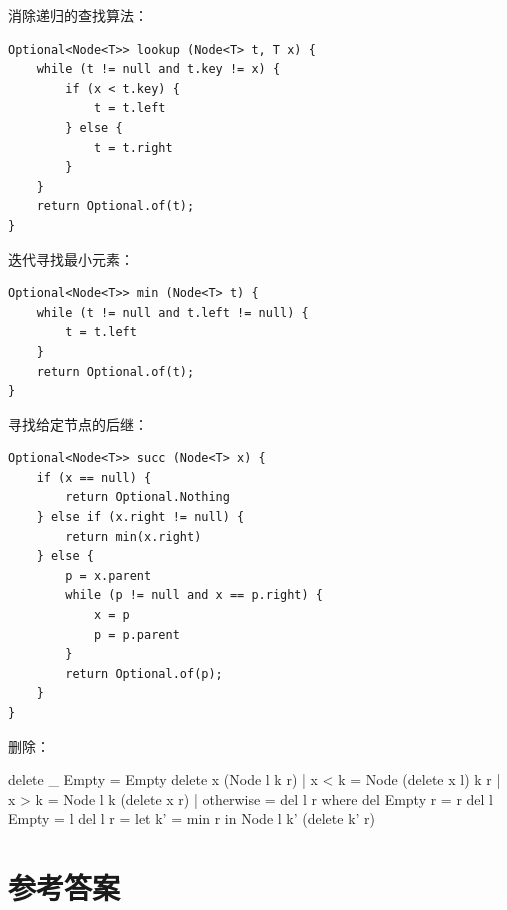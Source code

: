 \documentclass[b5paper]{ctexart}
\begin{document}
消除递归的查找算法：

\begin{lstlisting}
Optional<Node<T>> lookup (Node<T> t, T x) {
    while (t != null and t.key != x) {
        if (x < t.key) {
            t = t.left
        } else {
            t = t.right
        }
    }
    return Optional.of(t);
}
\end{lstlisting}

迭代寻找最小元素：

\begin{lstlisting}
Optional<Node<T>> min (Node<T> t) {
    while (t != null and t.left != null) {
        t = t.left
    }
    return Optional.of(t);
}
\end{lstlisting}

寻找给定节点的后继：

\begin{lstlisting}
Optional<Node<T>> succ (Node<T> x) {
    if (x == null) {
        return Optional.Nothing
    } else if (x.right != null) {
        return min(x.right)
    } else {
        p = x.parent
        while (p != null and x == p.right) {
            x = p
            p = p.parent
        }
        return Optional.of(p);
    }
}
\end{lstlisting}

删除：

\begin{Haskell}
delete _ Empty = Empty
delete x (Node l k r) | x < k = Node (delete x l) k r
                      | x > k = Node l k (delete x r)
                      | otherwise = del l r
  where
    del Empty r = r
    del l Empty = l
    del l r = let k' = min r in Node l k' (delete k' r)
\end{Haskell}

\section{参考答案}
\shipoutAnswer
\end{document}
